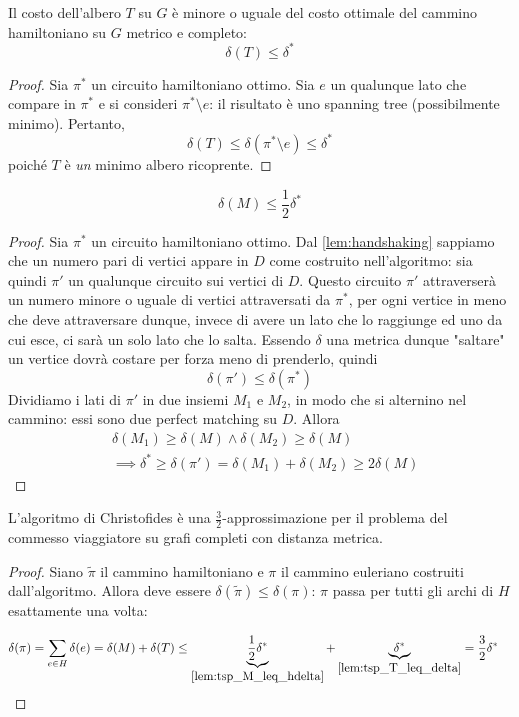 \begin{lemma}\label{lem:tsp_T_leq_delta}
	Il costo dell'albero $T$ su $G$ è minore o uguale del costo ottimale del cammino hamiltoniano su $G$ metrico
	e completo:
	$$
		\delta(T) \leq \delta^*
	$$
\end{lemma}

\begin{proof}
	Sia $\pi^*$ un circuito hamiltoniano ottimo. Sia $e$ un qualunque lato che compare in $\pi^*$ e si
	consideri $\pi^* \setminus e$: il risultato è uno spanning tree (possibilmente minimo). Pertanto,
	$$
		\delta(T) \leq \delta(\pi^* \setminus e) \leq \delta^*
	$$
	poiché $T$ è \textit{un} minimo albero ricoprente.
\end{proof}
\begin{lemma}\label{lem:tsp_M_leq_hdelta}
	$$
		\delta(M) \leq \frac{1}{2}\delta^*
	$$
\end{lemma}
\begin{proof}
	Sia $\pi^*$ un circuito hamiltoniano ottimo.
	Dal \cref{lem:handshaking} sappiamo che un numero pari di vertici appare in $D$ come costruito
	nell'algoritmo: sia quindi $\pi'$ un qualunque circuito sui vertici di $D$.
	Questo circuito $\pi'$ attraverserà un numero minore o uguale di vertici attraversati da $\pi^*$,
	per ogni vertice in meno che deve attraversare dunque, invece di avere un lato che lo raggiunge
	ed uno da cui esce, ci sarà un solo lato che lo salta.
	Essendo $\delta$ una metrica dunque "saltare" un vertice dovrà costare per forza meno di prenderlo,
	quindi
	$$
		\delta(\pi') \leq \delta(\pi^*)
	$$
	Dividiamo i lati di $\pi'$ in due insiemi $M_1$ e $M_2$, in modo che si
	alternino nel cammino: essi sono due perfect matching su $D$. Allora
	\begin{align*}
		 & \delta(M_1) \geq \delta(M) \land \delta(M_2) \geq \delta(M)                      \\
		 & \implies \delta^* \geq \delta(\pi') = \delta(M_1) + \delta(M_2) \geq 2 \delta(M)
	\end{align*}
\end{proof}
\begin{theorem}
	L'algoritmo di Christofides è una $\frac{3}{2}$-approssimazione per il problema del
	commesso viaggiatore su grafi completi con distanza metrica.
\end{theorem}
\begin{proof}
	Siano $\tilde{\pi}$ il cammino hamiltoniano e $\pi$ il cammino euleriano costruiti dall'algoritmo.
	Allora deve essere $\delta(\tilde{\pi}) \leq \delta(\pi)$: $\pi$ passa per tutti
	gli archi di $H$ esattamente una volta:

	\begin{align*}
		 & \delta(\pi) = \sum_{e \in H} \delta(e)  = \delta(M) + \delta(T) \leq
		\underbrace{\frac{1}{2} \delta^*}_{\cref{lem:tsp_M_leq_hdelta}} +
		\underbrace{\delta^*}_{\cref{lem:tsp_T_leq_delta}}  = \frac{3}{2} \delta^*
	\end{align*}
\end{proof}

